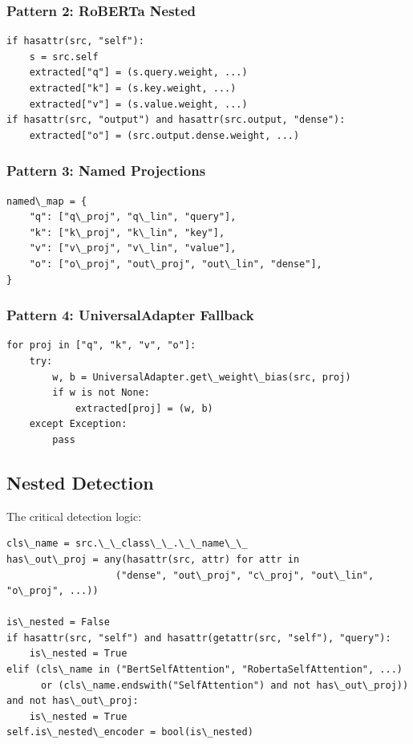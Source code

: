 \subsubsection{Pattern 2: RoBERTa Nested}

\begin{lstlisting}
if hasattr(src, "self"):
    s = src.self
    extracted["q"] = (s.query.weight, ...)
    extracted["k"] = (s.key.weight, ...)
    extracted["v"] = (s.value.weight, ...)
if hasattr(src, "output") and hasattr(src.output, "dense"):
    extracted["o"] = (src.output.dense.weight, ...)
\end{lstlisting}

\subsubsection{Pattern 3: Named Projections}

\begin{lstlisting}
named\_map = {
    "q": ["q\_proj", "q\_lin", "query"],
    "k": ["k\_proj", "k\_lin", "key"],
    "v": ["v\_proj", "v\_lin", "value"],
    "o": ["o\_proj", "out\_proj", "out\_lin", "dense"],
}
\end{lstlisting}

\subsubsection{Pattern 4: UniversalAdapter Fallback}

\begin{lstlisting}
for proj in ["q", "k", "v", "o"]:
    try:
        w, b = UniversalAdapter.get\_weight\_bias(src, proj)
        if w is not None:
            extracted[proj] = (w, b)
    except Exception:
        pass
\end{lstlisting}

\subsection{Nested Detection}

The critical detection logic:

\begin{lstlisting}
cls\_name = src.\_\_class\_\_.\_\_name\_\_
has\_out\_proj = any(hasattr(src, attr) for attr in 
                   ("dense", "out\_proj", "c\_proj", "out\_lin", "o\_proj", ...))

is\_nested = False
if hasattr(src, "self") and hasattr(getattr(src, "self"), "query"):
    is\_nested = True
elif (cls\_name in ("BertSelfAttention", "RobertaSelfAttention", ...)
      or (cls\_name.endswith("SelfAttention") and not has\_out\_proj)) and not has\_out\_proj:
    is\_nested = True
self.is\_nested\_encoder = bool(is\_nested)
\end{lstlisting}

